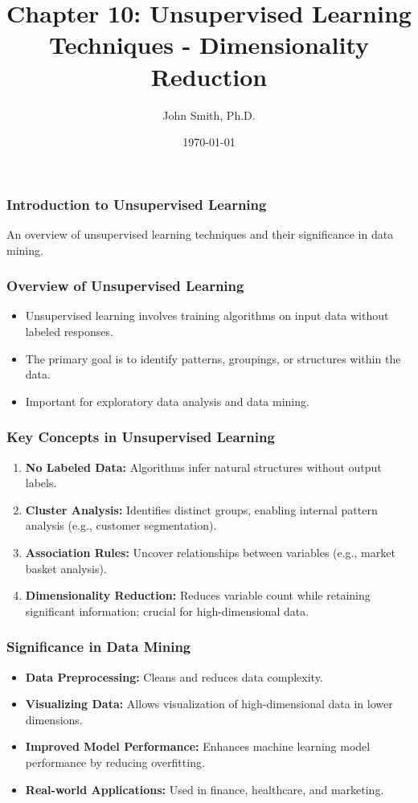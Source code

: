 \documentclass[aspectratio=169]{beamer}
\title[Chapter 10: Unsupervised Learning Techniques]{Chapter 10: Unsupervised Learning Techniques - Dimensionality Reduction}
\author[J. Smith]{John Smith, Ph.D.}
\institute[University Name]{
  Department of Computer Science\\
  University Name\\
  \vspace{0.3cm}
  Email: email@university.edu\\
  Website: www.university.edu
}
\date{\today}
\begin{document}
\frame{\titlepage}

\begin{frame}[fragile]
    \frametitle{Introduction to Unsupervised Learning}
    An overview of unsupervised learning techniques and their significance in data mining.
\end{frame}

\begin{frame}[fragile]
    \frametitle{Overview of Unsupervised Learning}
    \begin{itemize}
        \item Unsupervised learning involves training algorithms on input data without labeled responses.
        \item The primary goal is to identify patterns, groupings, or structures within the data.
        \item Important for exploratory data analysis and data mining.
    \end{itemize}
\end{frame}

\begin{frame}[fragile]
    \frametitle{Key Concepts in Unsupervised Learning}
    \begin{enumerate}
        \item \textbf{No Labeled Data:} Algorithms infer natural structures without output labels.
        \item \textbf{Cluster Analysis:} Identifies distinct groups, enabling internal pattern analysis (e.g., customer segmentation).
        \item \textbf{Association Rules:} Uncover relationships between variables (e.g., market basket analysis).
        \item \textbf{Dimensionality Reduction:} Reduces variable count while retaining significant information; crucial for high-dimensional data.
    \end{enumerate}
\end{frame}

\begin{frame}[fragile]
    \frametitle{Significance in Data Mining}
    \begin{itemize}
        \item \textbf{Data Preprocessing:} Cleans and reduces data complexity.
        \item \textbf{Visualizing Data:} Allows visualization of high-dimensional data in lower dimensions.
        \item \textbf{Improved Model Performance:} Enhances machine learning model performance by reducing overfitting.
        \item \textbf{Real-world Applications:} Used in finance, healthcare, and marketing.
    \end{itemize}
\end{frame}
\end{document}
